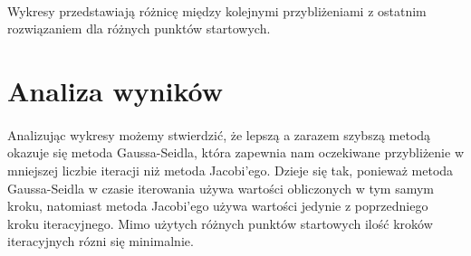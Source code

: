 \documentclass{article}
\begin{document}
\paragraph{}
Wykresy przedstawiają różnicę między kolejnymi przybliżeniami z ostatnim rozwiązaniem dla różnych punktów startowych.


\begingroup\centering





\endgroup


\pagebreak

\section{Analiza wyników}
\paragraph{}
Analizując wykresy możemy stwierdzić, że lepszą a zarazem szybszą metodą okazuje się metoda Gaussa-Seidla, która zapewnia nam oczekiwane
przybliżenie w mniejszej liczbie iteracji niż metoda Jacobi'ego. Dzieje się tak, ponieważ metoda Gaussa-Seidla w czasie iterowania używa
wartości obliczonych w tym samym kroku, natomiast metoda Jacobi'ego używa wartości jedynie z poprzedniego kroku iteracyjnego.
Mimo użytych różnych punktów startowych ilość kroków iteracyjnych rózni się minimalnie.
\end{document}
